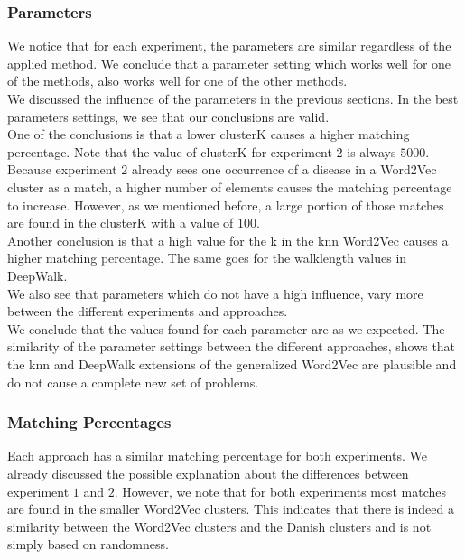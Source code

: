 \subsubsection{Parameters}

We notice that for each experiment, the parameters are similar regardless of the applied method. We conclude that a parameter setting which works well for one of the methods, also works well for one of the other methods. \\

We discussed the influence of the parameters in the previous sections. In the best parameters settings, we see that our conclusions are valid. \\
One of the conclusions is that a lower clusterK causes a higher matching percentage. Note that the value of clusterK for experiment $2$ is always $5000$. Because experiment $2$ already sees one occurrence of a disease in a Word2Vec cluster as a match, a higher number of elements causes the matching percentage to increase. However, as we mentioned before, a large portion of those matches are found in the clusterK with a value of $100$. \\
Another conclusion is that a high value for the k in the knn Word2Vec causes a higher matching percentage. The same goes for the walklength values in DeepWalk. \\ 
We also see that parameters which do not have a high influence, vary more between the different experiments and approaches. \\

We conclude that the values found for each parameter are as we expected. The similarity of the parameter settings between the different approaches, shows that the knn and DeepWalk extensions of the generalized Word2Vec are plausible and do not cause a complete new set of problems.

\subsubsection{Matching Percentages}

Each approach has a similar matching percentage for both experiments. We already discussed the possible explanation about the differences between experiment $1$ and $2$. However, we note that for both experiments most matches are found in the smaller Word2Vec clusters. This indicates that there is indeed a similarity between the Word2Vec clusters and the Danish clusters and is not simply based on randomness. \\

